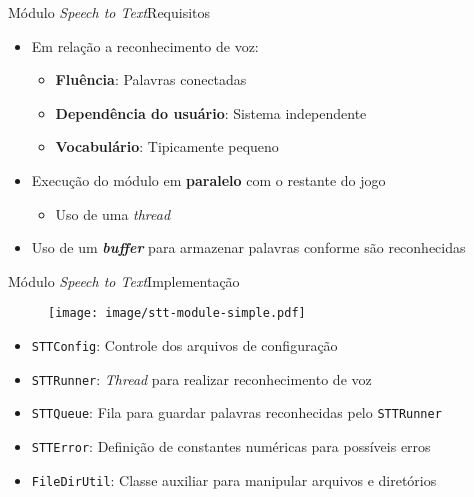 \begin{frame}{Módulo \textit{Speech to Text}}{Requisitos}

\begin{itemize}
\item Em relação a reconhecimento de voz:
\begin{itemize}
  \item \textbf{Fluência}: Palavras conectadas
  \item<2-> \textbf{Dependência do usuário}: Sistema independente
  \item<3-> \textbf{Vocabulário}: Tipicamente pequeno
\end{itemize}

\item<4-> Execução do módulo em \textbf{paralelo} com o restante do jogo
\begin{itemize}
  \item<5-> Uso de uma \textit{thread}
\end{itemize}

\item<6-> Uso de um \textbf{\textit{buffer}} para armazenar palavras conforme são reconhecidas
\end{itemize}
\end{frame}


\begin{frame}{Módulo \textit{Speech to Text}}{Implementação}

\begin{figure}
\texttt{[image: image/stt-module-simple.pdf]}
\end{figure}

\begin{itemize}
\item<2-> \texttt{STTConfig}: Controle dos arquivos de configuração
\item<3-> \texttt{STTRunner}: \textit{Thread} para realizar reconhecimento de voz
\item<4-> \texttt{STTQueue}: Fila para guardar palavras reconhecidas pelo \texttt{STTRunner}
\item<5-> \texttt{STTError}: Definição de constantes numéricas para possíveis erros
\item<6-> \texttt{FileDirUtil}: Classe auxiliar para manipular arquivos e diretórios
\end{itemize}

\end{frame}
